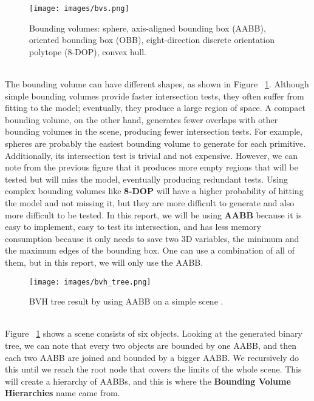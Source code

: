 \documentclass[11pt,a4paper]{article}
\begin{document}
\begin{figure}[h]	
     \centering
     \captionsetup{justification=centering,margin=2cm}
     \texttt{[image: images/bvs.png]}
     \caption{Bounding volumes: sphere, axis-aligned bounding box (AABB), oriented bounding box (OBB), eight-direction discrete orientation polytope (8-DOP), convex hull. \protect\cite{Ericson2004}}
     \label{fig:boundingboxes}
\end{figure}


\noindent
\\
The bounding volume can have different shapes, as shown in Figure ~\ref{fig:boundingboxes}. Although simple bounding volumes provide faster intersection tests, they often suffer from fitting to the model; eventually, they produce a large region of space. A compact bounding volume, on the other hand, generates fewer overlaps with other bounding volumes in the scene, producing fewer intersection tests. For example, spheres are probably the easiest bounding volume to generate for each primitive. Additionally, its intersection test is trivial and not expensive. However, we can note from the previous figure that it produces more empty regions that will be tested but will miss the model, eventually producing redundant tests. Using complex bounding volumes like \textbf{8-DOP} will have a higher probability of hitting the model and not missing it, but they are more difficult to generate and also more difficult to be tested. In this report, we will be using \textbf{AABB} because it is easy to implement, easy to test its intersection, and has less memory consumption because it only needs to save two 3D variables, the minimum and the maximum edges of the bounding box. One can use a combination of all of them, but in this report, we will only use the AABB.

\begin{figure}[h]	
     \centering
     \captionsetup{justification=centering,margin=2cm}
     \texttt{[image: images/bvh\_tree.png]}
     \caption{BVH tree result by using AABB on a simple scene
. \protect\cite{Ericson2004} }
        \label{fig:boundingvolume}
\end{figure}

\noindent
\\
Figure ~\ref{fig:boundingboxes} shows a scene consists of six objects. Looking at the generated binary tree, we can note that every two objects are bounded by one AABB, and then each two AABB are joined and bounded by a bigger AABB. We recursively do this until we reach the root node that covers the limits of the whole scene. This will create a hierarchy of AABBs, and this is where the \textbf{Bounding Volume Hierarchies} name came from.
\end{document}
